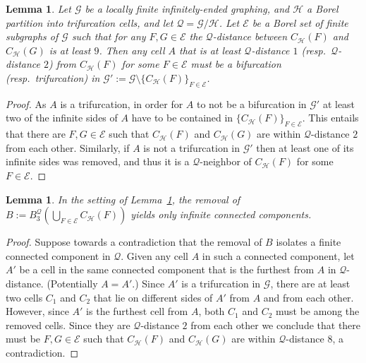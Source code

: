 \documentclass{article}
\theoremstyle{plain}
\newtheorem{lem}[thm]{Lemma}
\theoremstyle{definition}
\newcommand{\cG}{\mathcal{G}}
\newcommand{\cQ}{\mathcal{Q}}
\newcommand{\cE}{\mathcal{E}}
\newcommand{\cH}{\mathcal{H}}
\begin{document}
\begin{lem}\label{lem:bi_tri}
    Let $\cG$ be a locally finite infinitely-ended graphing, and $\cH$ a Borel partition into trifurcation cells, and let $\cQ=\cG/\cH$. Let $\cE$ be a Borel set of finite subgraphs of $\cG$ such that for any $F,G\in \cE$ the $\cQ$-distance between $C_\cH(F)$ and $C_\cH(G)$ is at least $9$.    
    Then any cell $A$ that is at least $\cQ$-distance $1$ (resp.~$\cQ$-distance $2$) from $C_\cH(F)$ for some $F\in\cE$ must be a bifurcation (resp.~trifurcation) in $\cG':=\cG\setminus \{C_{\cH}(F)\}_{F\in\cE}$.
\end{lem}
\begin{proof}
    As $A$ is a trifurcation, in order for $A$ to not be a bifurcation in $\cG'$ at least two of the infinite sides of $A$ have to be contained in $\{C_{\cH}(F)\}_{F\in \cE}$. This entails that there are $F,G\in \cE$ such that $C_\cH(F)$ and $C_\cH(G)$ are within $\cQ$-distance $2$ from each other.
    Similarly, if $A$ is not a trifurcation in $\cG'$ then at least one of its infinite sides was removed, and thus it is a $\cQ$-neighbor of $C_\cH(F)$ for some $F\in\cE$.
\end{proof}

\begin{lem}%
\label{lem:inf_comp}
    In the setting of Lemma~\ref{lem:bi_tri}, the removal of $B:=B_3^{\cQ}\left(\bigcup_{F\in \cE}C_{\cH}(F)\right)$ yields only infinite connected components.  
\end{lem}

\begin{proof}
    Suppose towards a contradiction that the removal of $B$ isolates a finite connected component in $\cQ$. Given any cell $A$ in such a connected component, let $A'$ be a cell in the same connected component that is the furthest from $A$ in $\cQ$-distance. (Potentially $A=A'$.) %
    Since $A'$ is a trifurcation in $\cG$, there are at least two cells $C_1$ and $C_2$ that lie on different sides of $A'$ from $A$ and from each other. However, since $A'$ is the furthest cell from $A$, both $C_1$ and $C_2$ must be among the removed cells. Since they are $\cQ$-distance $2$ from each other we conclude that there must be $F,G\in \cE$ such that $C_\cH(F)$ and $C_\cH(G)$ are within $\cQ$-distance $8$, a contradiction. 
\end{proof}
\end{document}
